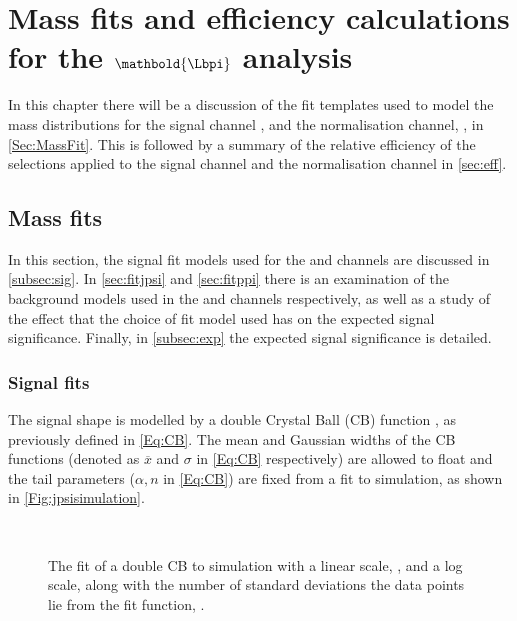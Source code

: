\chapter{Mass fits and efficiency calculations for the $\mathbold{\Lbpi}$ analysis}
In this chapter there will be a discussion of the fit templates used to model the mass distributions for the signal channel \Lbpi, and the normalisation channel, \Lbpijpsi, in \autoref{Sec:MassFit}. This is followed by a summary of the relative efficiency of the selections applied to the signal channel and the normalisation channel in \autoref{sec:eff}.
\label{chap:mass}
\section{Mass fits}
\label{Sec:MassFit}
In this section, the signal fit models used for the \Lbpi and \Lbpijpsi channels are discussed in \autoref{subsec:sig}. In \autoref{sec:fitjpsi} and \autoref{sec:fitppi} there is an examination of the background models used in the \Lbpijpsi and \Lbpi channels respectively, as well as a study of the effect that the choice of fit model used has on the expected signal significance. Finally, in \autoref{subsec:exp} the expected signal significance is detailed.
\subsection{Signal fits}
\label{subsec:sig}
The \Lbpijpsi signal shape is modelled by a double Crystal Ball (\Gls{CB}) function \cite{Skwarnicki:1986xj}, as previously defined in \autoref{Eq:CB}. The mean and Gaussian widths of the CB functions (denoted as $\overline{x}$ and $\sigma$ in \autoref{Eq:CB} respectively) are allowed to float and the tail parameters ($\alpha, n$ in \autoref{Eq:CB}) are fixed from  a fit to \Lbpijpsi simulation, as shown in \autoref{Fig:jpsisimulation}. %
\begin{figure}[!ht]\def\nh{0.3\textwidth}
  \centering
  \\
    \caption{The fit of a double CB to \Lbpijpsi simulation with a linear scale, \protect{}, and a log scale, along with the number of standard deviations the data points lie from the fit function, \protect{}.}
    \label{Fig:jpsisimulation}
\end{figure}


